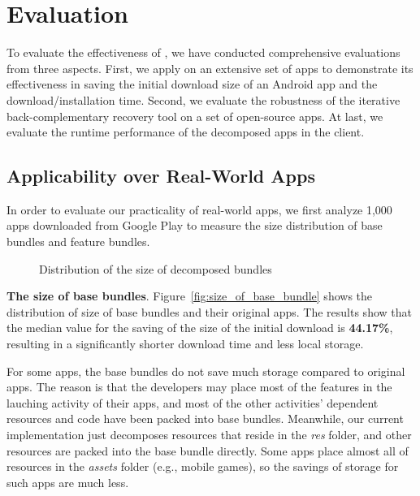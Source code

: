 \section{Evaluation}
\label{sec:evaluation}

To evaluate the effectiveness of \nickName, we have conducted comprehensive evaluations from three aspects. 
First, we apply \nickName on an extensive set of apps to demonstrate its effectiveness in saving the initial download size of an Android app and the download/installation time. 
Second, we evaluate the robustness of the iterative back-complementary recovery tool on a set of open-source apps. 
At last, we evaluate the runtime performance of the decomposed apps in the \nickName{} client.


\subsection{Applicability over Real-World Apps}
In order to evaluate our practicality of real-world apps, we first analyze 1,000 apps downloaded from Google Play to measure the size distribution of base bundles and feature bundles. 


\begin{figure}[!t]
   \centering
      \hspace{0in}
      \hspace{0in}
      \label{fig:decomposition}
      \caption{Distribution of the size of decomposed bundles}
\end{figure}



\noindent\textbf{The size of base bundles}. Figure~\ref{fig:size_of_base_bundle} shows the distribution of  size of base bundles and their original apps.
The results show that the median value for the saving of the size of the initial download is \textbf{44.17\%}, resulting in a significantly shorter download time and less local storage.

For some apps, the base bundles do not save much storage compared to original apps. 
The reason is that the developers may place most of the features in the lauching activity of their apps, and most of the other activities' dependent resources and code have been packed into base bundles. Meanwhile, our current implementation just decomposes resources that reside in the \textit{res} folder, and other resources are packed into the base bundle directly. Some apps place almost all of resources in the \textit{assets} folder (e.g., mobile games), so the savings of storage for such apps are much less.


